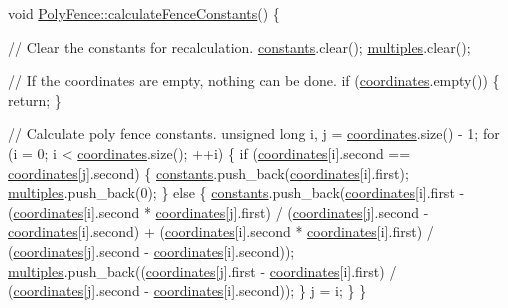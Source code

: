 \begin{DoxyCode}
\textcolor{keywordtype}{void} \hyperlink{class_poly_fence_a229de6f5987bf7d312310b522db0d5a4}{PolyFence::calculateFenceConstants}()
\{

    \textcolor{comment}{// Clear the constants for recalculation.}
    \hyperlink{class_poly_fence_a24c99bb8a45f86bdf51cd3f22ef0f174}{constants}.clear();
    \hyperlink{class_poly_fence_a2204e62b61b0e3c335734fa0b6cf0728}{multiples}.clear();

    \textcolor{comment}{// If the coordinates are empty, nothing can be done.}
    \textcolor{keywordflow}{if} (\hyperlink{class_poly_fence_ae8e0c55e745979cab104ef80aeb4b418}{coordinates}.empty()) \{
        \textcolor{keywordflow}{return};
    \}

    \textcolor{comment}{// Calculate poly fence constants.}
    \textcolor{keywordtype}{unsigned} \textcolor{keywordtype}{long} i, j = \hyperlink{class_poly_fence_ae8e0c55e745979cab104ef80aeb4b418}{coordinates}.size() - 1;
    \textcolor{keywordflow}{for} (i = 0; i < \hyperlink{class_poly_fence_ae8e0c55e745979cab104ef80aeb4b418}{coordinates}.size(); ++i) \{
        \textcolor{keywordflow}{if} (\hyperlink{class_poly_fence_ae8e0c55e745979cab104ef80aeb4b418}{coordinates}[i].second == \hyperlink{class_poly_fence_ae8e0c55e745979cab104ef80aeb4b418}{coordinates}[j].second) \{
            \hyperlink{class_poly_fence_a24c99bb8a45f86bdf51cd3f22ef0f174}{constants}.push\_back(\hyperlink{class_poly_fence_ae8e0c55e745979cab104ef80aeb4b418}{coordinates}[i].first);
            \hyperlink{class_poly_fence_a2204e62b61b0e3c335734fa0b6cf0728}{multiples}.push\_back(0);
        \} \textcolor{keywordflow}{else} \{
            \hyperlink{class_poly_fence_a24c99bb8a45f86bdf51cd3f22ef0f174}{constants}.push\_back(\hyperlink{class_poly_fence_ae8e0c55e745979cab104ef80aeb4b418}{coordinates}[i].first
                                - (\hyperlink{class_poly_fence_ae8e0c55e745979cab104ef80aeb4b418}{coordinates}[i].second * 
      \hyperlink{class_poly_fence_ae8e0c55e745979cab104ef80aeb4b418}{coordinates}[j].first)
                                  / (\hyperlink{class_poly_fence_ae8e0c55e745979cab104ef80aeb4b418}{coordinates}[j].second - 
      \hyperlink{class_poly_fence_ae8e0c55e745979cab104ef80aeb4b418}{coordinates}[i].second)
                                + (\hyperlink{class_poly_fence_ae8e0c55e745979cab104ef80aeb4b418}{coordinates}[i].second * 
      \hyperlink{class_poly_fence_ae8e0c55e745979cab104ef80aeb4b418}{coordinates}[i].first)
                                  / (\hyperlink{class_poly_fence_ae8e0c55e745979cab104ef80aeb4b418}{coordinates}[j].second - 
      \hyperlink{class_poly_fence_ae8e0c55e745979cab104ef80aeb4b418}{coordinates}[i].second));
            \hyperlink{class_poly_fence_a2204e62b61b0e3c335734fa0b6cf0728}{multiples}.push\_back((\hyperlink{class_poly_fence_ae8e0c55e745979cab104ef80aeb4b418}{coordinates}[j].first - 
      \hyperlink{class_poly_fence_ae8e0c55e745979cab104ef80aeb4b418}{coordinates}[i].first)
                                / (\hyperlink{class_poly_fence_ae8e0c55e745979cab104ef80aeb4b418}{coordinates}[j].second - 
      \hyperlink{class_poly_fence_ae8e0c55e745979cab104ef80aeb4b418}{coordinates}[i].second));
        \}
        j = i;
    \}
\}
\end{DoxyCode}
